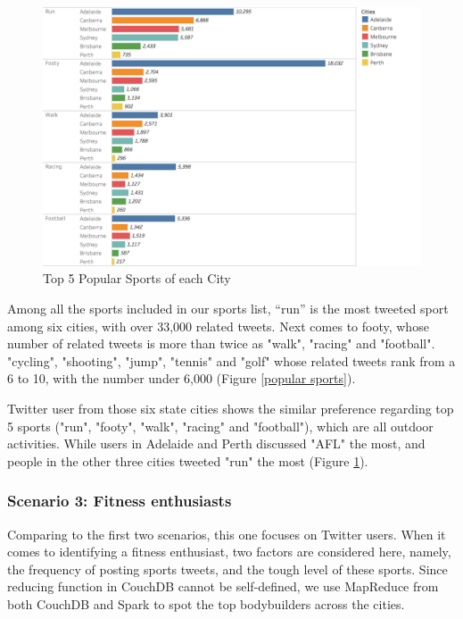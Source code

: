 \begin{figure}[h!]
\centerline{\includegraphics[width=6in]{Figures/popular sports summart.png}}
\caption{Top 5 Popular Sports of each City \label{popular sports of each city}}
\end{figure}

Among all the sports included in our sports list, “run” is the most tweeted sport among six cities, with over 33,000 related tweets. Next comes to footy, whose number of related tweets is more than twice as "walk", "racing" and "football". "cycling", "shooting", "jump", "tennis" and "golf" whose related tweets rank from a 6 to 10, with the number under 6,000 (Figure \ref{popular sports}).

Twitter user from those six state cities shows the similar preference regarding top 5 sports ("run", "footy", "walk", "racing" and "football"), which are all outdoor activities. While users in Adelaide and Perth discussed "AFL" the most, and people in the other three cities tweeted "run" the most (Figure \ref{popular sports of each city}). 


\subsubsection{Scenario 3: Fitness enthusiasts}
Comparing to the first two scenarios, this one focuses on Twitter users. When it comes to identifying a fitness enthusiast, two factors are considered here, namely, the frequency of posting sports tweets, and the tough level of these sports. Since reducing function in CouchDB cannot be self-defined, we use MapReduce from both CouchDB and Spark to spot the top bodybuilders across the cities. 

